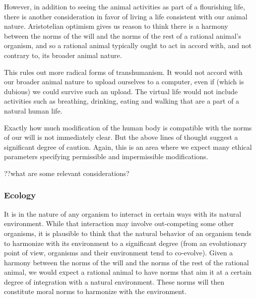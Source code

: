However, in addition to seeing the animal activities as part of a flourishing life, there is another consideration in favor of 
living a life consistent with our animal nature. Aristotelian optimism gives us reason to think there is a harmony between 
the norms of the will and the norms of the rest of a rational animal's organism, and so a rational animal typically ought to act in 
accord with, and not contrary to, its broader animal nature. 

This rules out more radical forms of transhumanism. It would not accord with our broader animal nature to upload ourselves to a computer,
even if (which is dubious) we could survive such an upload. The virtual life would not include 
activities such as breathing, drinking, eating and walking that are a part of a natural human life.

Exactly how much modification of the human body is compatible with the norms of our will is not immediately clear. But the above
lines of thought suggest a significant degree of caution. Again, this is an area where we expect many ethical parameters specifying
permissible and impermissible modifications.

??what are some relevant considerations?

\subsubsection{Ecology}
It is in the nature of any organism to interact in certain ways with its natural environment. While that interaction may 
involve out-competing some other organisms, it is plausible to think that the natural behavior of an organism tends to 
harmonize with its environment to a significant degree (from an evolutionary point of view, organisms and their environment tend 
to co-evolve). Given a harmony between the norms of the will and the norms of the rest of the rational animal, we would expect 
a rational animal to have norms that aim it at a certain degree of integration with a natural environment. These norms will then
constitute moral norms to harmonize with the environment.

